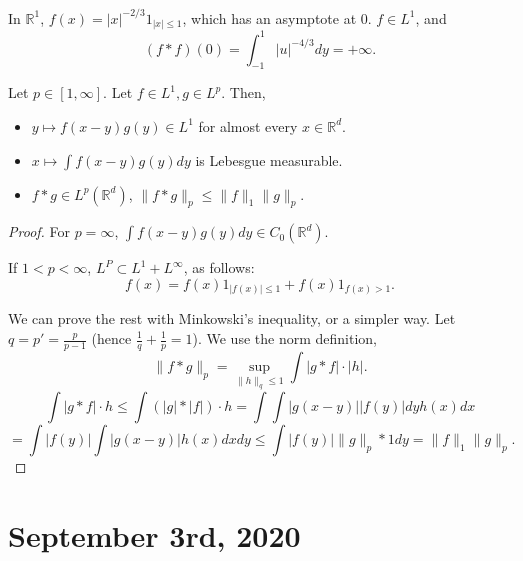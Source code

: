 \documentclass[11pt]{scrartcl}
\newcommand{\R}{\mathbb{R}}
\newcommand{\<}{\langle}
\renewcommand{\>}{\rangle}
\begin{document}
\begin{example}[A Warning] In $\R^1$, $f(x) = |x|^{-2/3} 1_{|x| \le 1}$, which has an asymptote at $0$.  $f \in L^1$, and 
$$(f*f)(0) = \int_{-1}^1 |u|^{-4/3}dy= + \infty.$$
\end{example}
\begin{proposition} Let $p \in [1, \infty]$.  Let $f \in L^1, g \in L^p$.  Then,
\begin{itemize}
\item $y \mapsto f(x-y) g(y) \in L^1$ for almost every $x \in \R^d$.
\item $x \mapsto \int f(x-y)g(y)dy$ is Lebesgue measurable.
\item $f*g \in L^p(\R^d)$, $\|f * g\|_p \le \|f\|_1 \|g\|_p$.
\end{itemize}
\end{proposition}
\begin{proof} 
For $p = \infty$, $\int f(x-y)g(y)dy \in C_0(\R^d)$.  

If $1 < p < \infty$, $L^P \subset L^1 + L^\infty$, as follows:
$$f(x) = f(x)1_{|f(x)| \le 1} + f(x)1_{f(x) > 1}.$$

We can prove the rest with Minkowski's inequality, or a simpler way.  Let $q = p' = \frac{p}{p-1}$ (hence $\frac{1}{q} + \frac{1}{p} = 1$).  
We use the norm definition,
$$\|f * g\|_p = \sup_{\|h\|_q \le 1} \int |g* f| \cdot |h|. $$
$$\int |g*f|\cdot h \le \int (|g|*|f|)\cdot h = \int \int |g(x-y)||f(y)|dy h(x)dx$$
$$= \int |f(y)| \int |g(x-y)|h(x)dxdy \le \int |f(y)| \|g\|_p *1 dy = \|f\|_1 \|g\|_p .$$
\end{proof}
\pagebreak
\section{September 3rd, 2020}
\end{document}
